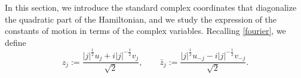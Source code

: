 \documentclass[reqno,11pt]{amsart}
\theoremstyle{plain}
\numberwithin{equation}{section}
\newcommand{\Z}{\mathbb{Z}}
\begin{document}
{In this section, we introduce the standard complex coordinates that diagonalize the quadratic part of the Hamiltonian, and we study the expression of the constants of motion in terms of the complex variables.
Recalling \eqref{fourier}, we define
\begin{equation}\label{z bar z}
z_j := \frac{|j|^{\frac12} u_j + i |j|^{-\frac12} v_j}{\sqrt2}, \qquad
\bar z_j := \frac{|j|^{\frac12} u_{-j} - i |j|^{-\frac12} v_{-j}}{\sqrt2}.
\end{equation}
%
}
\end{document}
